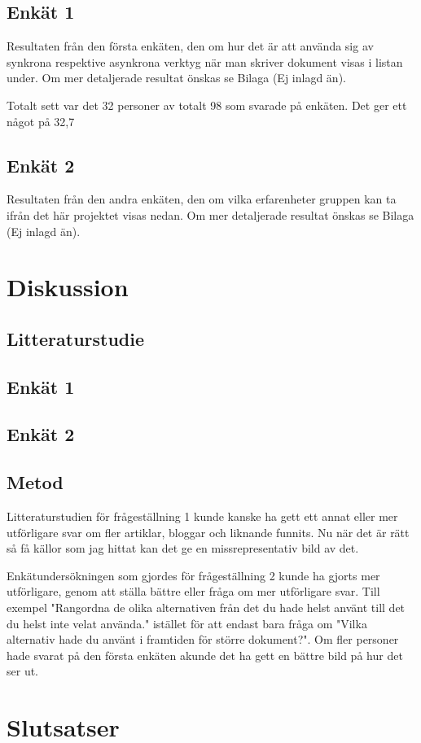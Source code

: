 \subsection{Enkät 1}
Resultaten från den första enkäten, den om hur det är att använda sig av synkrona respektive asynkrona verktyg när man skriver dokument visas i listan under. Om mer detaljerade resultat önskas se Bilaga (Ej inlagd än).

Totalt sett var det 32 personer av totalt 98 som svarade på enkäten. Det ger ett något på 32,7%

\subsection{Enkät 2}
Resultaten från den andra enkäten, den om vilka erfarenheter gruppen kan ta ifrån det här projektet visas nedan. Om mer detaljerade resultat önskas se Bilaga (Ej inlagd än).

\section{Diskussion}
\label{sec:discussion-tuhkala}

\subsection{Litteraturstudie}

\subsection{Enkät 1}

\subsection{Enkät 2}


\subsection{Metod}
Litteraturstudien för frågeställning 1 kunde kanske ha gett ett annat eller mer utförligare svar om fler artiklar, bloggar och liknande funnits. Nu när det är rätt så få källor som jag hittat kan det ge en missrepresentativ bild av det.

Enkätundersökningen som gjordes för frågeställning 2 kunde ha gjorts mer utförligare, genom att ställa bättre eller fråga om mer utförligare svar. Till exempel "Rangordna de olika alternativen från det du hade helst använt till det du helst inte velat använda." istället för att endast bara fråga om "Vilka alternativ hade du använt i framtiden för större dokument?". Om fler personer hade svarat på den första enkäten akunde det ha gett en bättre bild på hur det ser ut.

\section{Slutsatser}
\label{sec:conclusions-tuhkala}




